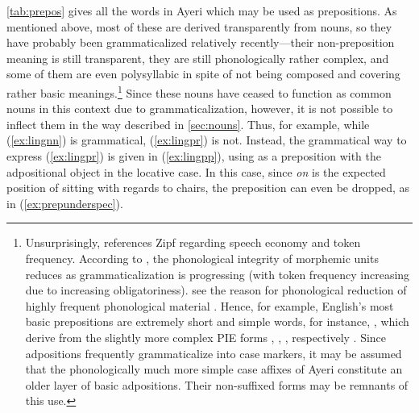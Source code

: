 
\autoref{tab:prepos} gives all the words in Ayeri which may be used as
prepositions. As mentioned above, most of these are derived transparently from
nouns, so they have probably been grammaticalized relatively recently---their
non-preposition meaning is still transparent, they are still phonologically
rather complex, and some of them are even polysyllabic in spite of not being
composed and covering rather basic meanings.\footnote{Unsurprisingly,
\citet[129]{hagege2010} references Zipf regarding speech economy and token
frequency. According to \citet[134--141]{lehmann2015}, the phonological
integrity of morphemic units reduces as grammaticalization is progressing (with
token frequency increasing due to increasing obligatoriness).
\citet{bybeehopper2001b} see the reason for phonological reduction of highly
frequent phonological material . Hence, for example, English's most basic prepositions
are extremely short and simple words, for instance, , which
derive from the slightly more complex PIE forms , ,
, respectively \citep[1, 39, 269]{kroonen2013}. Since adpositions
frequently grammaticalize into case markers, it may be assumed that the
phonologically much more simple case affixes of Ayeri constitute an older layer
of basic adpositions. Their non-suffixed forms may be remnants of this use.}
Since these nouns have ceased to function as common nouns in this context due
to grammaticalization, however, it is not possible to inflect them in the way
described in \autoref{sec:nouns}. Thus, for example, while (\ref{ex:lingnn}) is
grammatical, (\ref{ex:lingpr}) is not. Instead, the grammatical way to express
(\ref{ex:lingpr}) is given in (\ref{ex:lingpp}), using  as a
preposition with the adpositional object in the locative case. In this case,
since \emph{on} is the expected position of sitting with regards to chairs, the
preposition can even be dropped, as in (\ref{ex:prepunderspec}).

